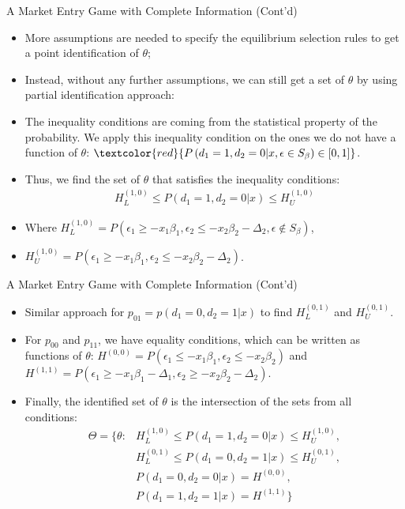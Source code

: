 \documentclass[aspectratio=169]{beamer}  %
\begin{document}
\begin{frame}{A Market Entry Game with Complete Information (Cont'd)}
\begin{itemize}
\item More assumptions are needed to specify the equilibrium selection rules to get a point identification of $\theta$;
\item Instead, without any further assumptions, we can still get a set of $\theta$ by using partial identification approach:
\item The inequality conditions are coming from the statistical property of the probability. We apply this inequality condition on the ones we do not have a function of $\theta$: $\textcolor{red}{P \left(d_1 = 1, d_2 =0 | x, \epsilon \in S_\beta \right) \in [0, 1]}$.
\item Thus, we find the set of $\theta$ that satisfies the inequality conditions:
    \begin{align*}
        H_L^{(1,0)}\leq P(d_1 = 1, d_2 = 0 | x) \leq H_U^{(1,0)}
    \end{align*}
    \item Where $H_L^{(1,0)} = P \left(\epsilon_1 \geq -x_1 \beta_1, \epsilon_2 \leq -x_2 \beta_2 - \Delta_2, \epsilon \notin S_\beta \right)$,
    \item $H_U^{(1,0)} = P \left(\epsilon_1 \geq -x_1 \beta_1, \epsilon_2 \leq -x_2 \beta_2 - \Delta_2\right)$.
\end{itemize}
\end{frame}

\begin{frame}{A Market Entry Game with Complete Information (Cont'd)}
\begin{itemize}
    \item Similar approach for $p_{01} = p\left(d_1 = 0, d_2 = 1 | x\right)$ to find $H_L^{(0,1)}$ and $H_U^{(0,1)}$.
    \item For $p_{00}$ and $p_{11}$, we have equality conditions, which can be written as functions of $\theta$: $H^{(0,0)} = P \left(\epsilon_1 \leq -x_1 \beta_1, \epsilon_2 \leq -x_2 \beta_2\right)$ and $H^{(1,1)} = P \left(\epsilon_1 \geq -x_1 \beta_1 - \Delta_1, \epsilon_2 \geq -x_2 \beta_2 - \Delta_2\right)$.
    \item Finally, the identified set of $\theta$ is the intersection of the sets from all conditions:
    \begin{equation*}
            \begin{aligned}
            \Theta = \{\theta: &H_L^{(1,0)}\leq P(d_1 = 1, d_2 = 0 | x) \leq H_U^{(1,0)}, \\
                            &H_L^{(0,1)}\leq P(d_1 = 0, d_2 = 1 | x) \leq H_U^{(0,1)}, \\
                            &P(d_1 = 0, d_2 = 0 |x) = H^{(0,0)}, \\
                            &P(d_1 = 1, d_2 = 1 | x) = H^{(1,1)} \}
            \end{aligned}
    \end{equation*}
\end{itemize}
\end{frame}
\end{document}
